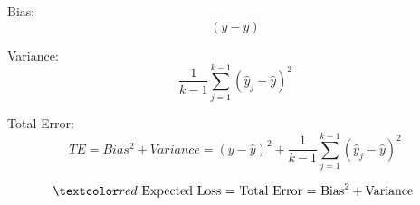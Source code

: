 \documentclass[
	title={Linear Regression}
]{cs584notes}
\begin{document}
Bias:
\begin{equation}
	(y - \hat{y})
	\label{eq:bias}
\end{equation}

Variance:
\begin{equation}
	\frac{1}{k-1} \sum_{j=1}^{k-1} \left( \hat{y}_{j} - \hat{y} \right)^{2}
	\label{eq:variance}
\end{equation}

Total Error:
\begin{equation}
	TE = Bias^{2} + Variance = (y - \hat{y})^{2} + \frac{1}{k-1} \sum_{j=1}^{k-1} \left( \hat{y}_{j} - \hat{y} \right)^{2}
	\label{eq:total-error}
\end{equation}

\[ \data{ \mbox{ Expected Loss = Total Error = Bias}^{2} + \mbox{Variance } } \]
\end{document}
